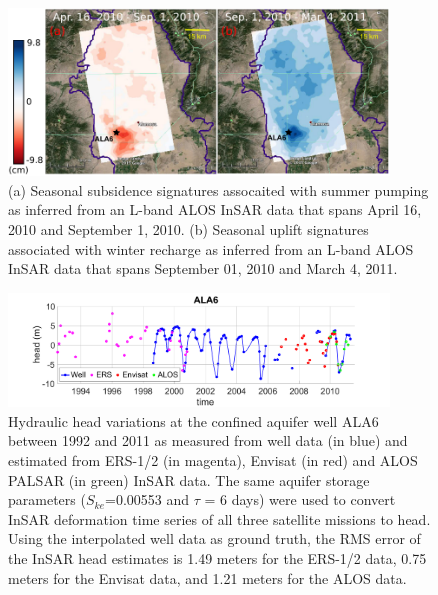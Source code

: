 \documentclass[11pt,final]{article}%
\begin{document}
\begin{figure}
\noindent\includegraphics[width=0.9\textwidth]{Figures/slv_seasonal.pdf}
\caption{ (a) Seasonal subsidence signatures assocaited with summer pumping as inferred from an L-band ALOS InSAR data that spans April 16, 2010 and September 1, 2010. (b) Seasonal uplift signatures associated with winter recharge as inferred from an L-band ALOS InSAR data that spans September 01, 2010 and March 4, 2011.}
\label{fig:seasonal_def}
\end{figure}

\begin{figure}
\noindent\includegraphics[width=0.9\textwidth]{Figures/ALA6.pdf}
\caption{Hydraulic head variations at the confined aquifer well ALA6 between 1992 and 2011 as measured from well data (in blue) and estimated from ERS-1/2 (in magenta), Envisat (in red) and ALOS PALSAR (in green) InSAR data. The same aquifer storage parameters ($S_{ke}$=0.00553 and $\tau$ = 6 days) were used to convert InSAR deformation time series of all three satellite missions to head. Using the interpolated well data as ground truth, the RMS error of the InSAR head estimates is 1.49 meters for the ERS-1/2 data, 0.75 meters for the Envisat data, and 1.21 meters for the ALOS data.}
\label{fig:ALA6}
\end{figure}
\end{document}

